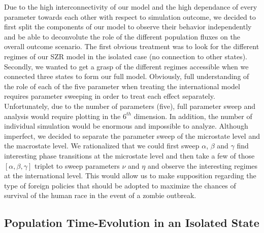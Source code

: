 \documentclass[11pt]{article} %
\begin{document}
Due to the high interconnectivity of our model and the high dependance of every parameter towards each other with respect to simulation outcome, we decided to first split the components of our model to observe their behavior independently and be able to deconvolute the role of the different population fluxes on the overall outcome scenario. The first obvious treatment was to look for the different regimes of our SZR model in the isolated case (no connection to other states). Secondly, we wanted to get a grasp of the different regimes accessible when we connected three states to form our full model. Obviously, full understanding of the role of each of the five parameter when treating the international model requires parameter sweeping in order to treat each effect separately. Unfortunately, due to the number of parameters (five), full parameter sweep and analysis would require plotting in the $6^{th}$ dimension. In addition, the number of individual simulation would be enormous and impossible to analyze. Although imperfect, we decided to separate the parameter sweep of the microstate level and the macrostate level. We rationalized that we could first sweep $\alpha$, $\beta$ and $\gamma$  find interesting phase transitions at the microstate level and then take a few of those $[\alpha, \beta, \gamma]$ triplet to sweep parameters $\nu$ and $\eta$ and observe the interesting regimes at the international level. This would allow us to make supposition regarding the type of foreign policies that should be adopted to maximize the chances of survival of the human race in the event of a zombie outbreak. 

\subsection{Population Time-Evolution in an Isolated State}\indent
\label{szr}
\end{document}
